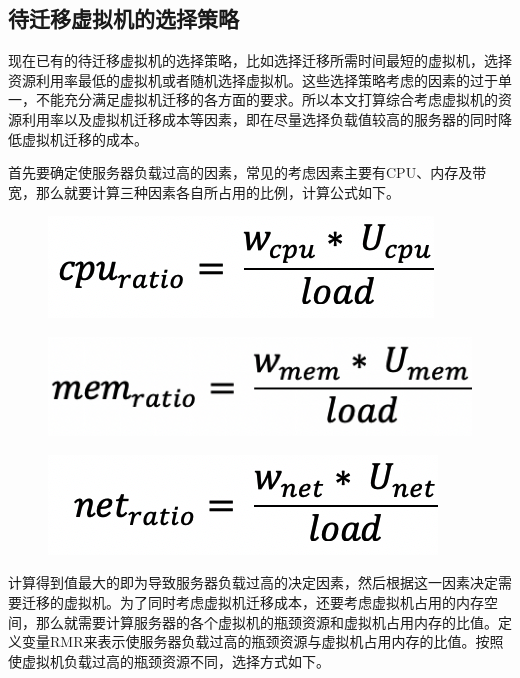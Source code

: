 \subsection{待迁移虚拟机的选择策略}
现在已有的待迁移虚拟机的选择策略，比如选择迁移所需时间最短的虚拟机，选择资源利用率最低的虚拟机或者随机选择虚拟机。这些选择策略考虑的因素的过于单一，不能充分满足虚拟机迁移的各方面的要求。所以本文打算综合考虑虚拟机的资源利用率以及虚拟机迁移成本等因素，即在尽量选择负载值较高的服务器的同时降低虚拟机迁移的成本。

首先要确定使服务器负载过高的因素，常见的考虑因素主要有CPU、内存及带宽，那么就要计算三种因素各自所占用的比例，计算公式如下。

 \begin{figure}[htb]
  \centering
  \includegraphics[width=0.3\linewidth]{./Figure/IMG_Chap3_9.png}
\end{figure}

 \begin{figure}[htb]
  \centering
  \includegraphics[width=0.3\linewidth]{./Figure/IMG_Chap3_10.png}
\end{figure}

 \begin{figure}[htb]
  \centering
  \includegraphics[width=0.3\linewidth]{./Figure/IMG_Chap3_11.png}
\end{figure}

计算得到值最大的即为导致服务器负载过高的决定因素，然后根据这一因素决定需要迁移的虚拟机。为了同时考虑虚拟机迁移成本，还要考虑虚拟机占用的内存空间，那么就需要计算服务器的各个虚拟机的瓶颈资源和虚拟机占用内存的比值。定义变量RMR来表示使服务器负载过高的瓶颈资源与虚拟机占用内存的比值。按照使虚拟机负载过高的瓶颈资源不同，选择方式如下。

